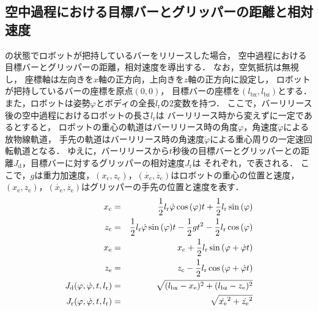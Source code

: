         \subsection{空中過程における目標バーとグリッパーの距離と相対速度}

          の状態でロボットが把持しているバーをリリースした場合，
          空中過程における目標バーとグリッパーの距離，相対速度を導出する．
          なお，空気抵抗は無視し，
          座標軸は左向きを$x$軸の正方向，上向きを$z$軸の正方向に設定し，
          ロボットが把持しているバーの座標を原点$(0,0)$，
          目標バーの座標を$(l_{\mathrm{bx}},l_{\mathrm{bz}})$とする．
          また，ロボットは姿勢$\varphi$とボディの全長$l_{\mathrm{r}}$の2変数を持つ．         
          ここで，バーリリース後の空中過程におけるロボットの長さ$l_{\mathrm{r}}$は
          バーリリース時から変えずに一定であるとすると， 
          ロボットの重心の軌道はバーリリース時の角度$\varphi$，角速度$\dot{\varphi}$による放物線軌道，
          手先の軌道はバーリリース時の角速度$\dot{\varphi}$による重心周りの一定速回転軌道となる．
          ゆえに，バーリリースから$t$秒後の目標バーとグリッパーとの距離$J_{\mathrm{d}}$，目標バーに対するグリッパーの相対速度$J_{\mathrm{r}}$は
          それぞれ，で表される．
          ここで，$g$は重力加速度，$(x_{\mathrm{c}},z_{\mathrm{c}})$，$(\dot{x_{\mathrm{c}}},\dot{z_{\mathrm{c}}})$はロボットの重心の位置と速度，
          $(x_{\mathrm{e}},z_{\mathrm{e}})$，$(\dot{x_{\mathrm{e}}},\dot{z_{\mathrm{e}}})$はグリッパーの手先の位置と速度を表す．
          \begin{eqnarray}
            \equlabel{x-c}
            x_{\mathrm{c}}&=&\frac{1}{2}l_{\mathrm{r}}\dot{\varphi}\cos{(\varphi)}t+\frac{1}{2}l_{\mathrm{r}}\sin{(\varphi)}\\
            \equlabel{z-c}
            z_{\mathrm{c}}&=&\frac{1}{2}l_{\mathrm{r}}\dot{\varphi}\sin{(\varphi)}t-\frac{1}{2}gt^2-\frac{1}{2}l_{\mathrm{r}}\cos{(\varphi)}\\
            \equlabel{x-e}
            x_{\mathrm{e}}&=&x_{\mathrm{c}}+\frac{1}{2}l_{\mathrm{r}}\sin{(\varphi+\dot{\varphi}t)}\\
            \equlabel{z-e}
            z_{\mathrm{e}}&=&z_{\mathrm{c}}-\frac{1}{2}l_{\mathrm{r}}\cos{(\varphi+\dot{\varphi}t)}\\
            \equlabel{Jd}
              J_{\mathrm{d}}(\varphi,\dot{\varphi},t,l_{\mathrm{r}})
              &=&\sqrt{(l_{\mathrm{bx}}-x_{\mathrm{e}})^2+(l_{\mathrm{bz}}-z_{\mathrm{e}})^2}\\
            \equlabel{Jr}
            J_{\mathrm{r}}(\varphi,\dot{\varphi},t,l_{\mathrm{r}})
            &=&\sqrt{\dot{x_{\mathrm{e}}}^2+\dot{z_{\mathrm{e}}}^2}
          \end{eqnarray}  
        

